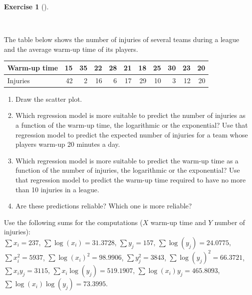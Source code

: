 \documentclass[
  a4paper,
]{scrreport}
\theoremstyle{definition}
\newtheorem{exercise}{Exercise}[chapter]
\theoremstyle{remark}
\begin{document}
\begin{exercise}[]\protect\hypertarget{exr-2}{}\label{exr-2}

~

The table below shows the number of injuries of several teams during a
league and the average warm-up time of its players.

\begin{table}
\centering
\begin{tabular}{l|r|r|r|r|r|r|r|r|r|r}
\hline
Warm-up time & 15 & 35 & 22 & 28 & 21 & 18 & 25 & 30 & 23 & 20\\
\hline
Injuries & 42 & 2 & 16 & 6 & 17 & 29 & 10 & 3 & 12 & 20\\
\hline
\end{tabular}
\end{table}

\begin{enumerate}
\def\labelenumi{\alph{enumi}.}
\item
  Draw the scatter plot.
\item
  Which regression model is more suitable to predict the number of
  injuries as a function of the warm-up time, the logarithmic or the
  exponential? Use that regression model to predict the expected number
  of injuries for a team whose players warm-up 20 minutes a day.
\item
  Which regression model is more suitable to predict the warm-up time as
  a function of the number of injuries, the logarithmic or the
  exponential? Use that regression model to predict the warm-up time
  required to have no more than 10 injuries in a league.
\item
  Are these predictions reliable? Which one is more reliable?
\end{enumerate}

Use the following sums for the computations (\(X\) warm-up time and
\(Y\) number of injuries):\\
\(\sum x_i=237\), \(\sum \log(x_i)=31.3728\), \(\sum y_j=157\),
\(\sum \log(y_j)=24.0775\),\\
\(\sum x_i^2=5937\), \(\sum \log(x_i)^2=98.9906\), \(\sum y_j^2=3843\),
\(\sum \log(y_j)^2=66.3721\),\\
\(\sum x_iy_j=3115\), \(\sum x_i\log(y_j)=519.1907\),
\(\sum \log(x_i)y_j=465.8093\), \(\sum \log(x_i)\log(y_j)=73.3995\).

\end{exercise}
\end{document}
